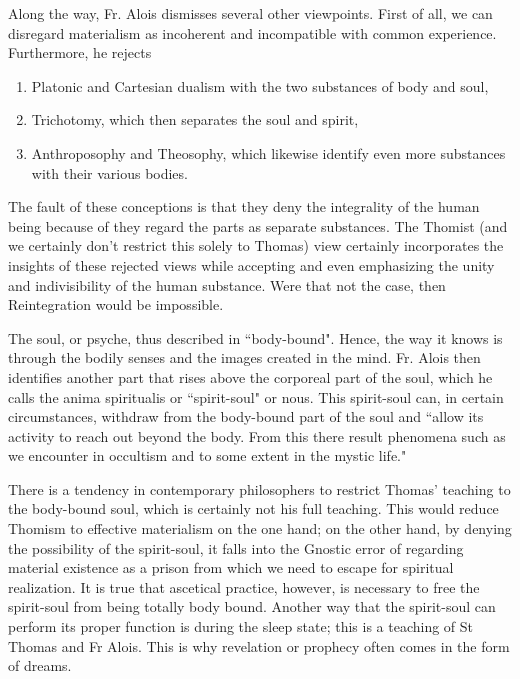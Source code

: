 Along the way, Fr. Alois dismisses several other viewpoints. First of all, we can disregard materialism as incoherent and incompatible with common experience. Furthermore, he rejects

\begin{enumerate}
\item Platonic and Cartesian dualism with the two substances of body and soul,
\item Trichotomy, which then separates the soul and spirit,
\item Anthroposophy and Theosophy, which likewise identify even more substances with their various bodies.
\end{enumerate}

The fault of these conceptions is that they deny the integrality of the human being because of they regard the parts as separate substances. The Thomist (and we certainly don't restrict this solely to Thomas) view certainly incorporates the insights of these rejected views while accepting and even emphasizing the unity and indivisibility of the human substance. Were that not the case, then Reintegration would be impossible.

The soul, or psyche, thus described in ``body-bound". Hence, the way it knows is through the bodily senses and the images created in the mind. Fr. Alois then identifies another part that rises above the corporeal part of the soul, which he calls the anima spiritualis or ``spirit-soul" or nous. This spirit-soul can, in certain circumstances, withdraw from the body-bound part of the soul and ``allow its activity to reach out beyond the body. From this there result phenomena such as we encounter in occultism and to some extent in the mystic life."

There is a tendency in contemporary philosophers to restrict Thomas' teaching to the body-bound soul, which is certainly not his full teaching. This would reduce Thomism to effective materialism on the one hand; on the other hand, by denying the possibility of the spirit-soul, it falls into the Gnostic error of regarding material existence as a prison from which we need to escape for spiritual realization. It is true that ascetical practice, however, is necessary to free the spirit-soul from being totally body bound. Another way that the spirit-soul can perform its proper function is during the sleep state; this is a teaching of St Thomas and Fr Alois. This is why revelation or prophecy often comes in the form of dreams.


